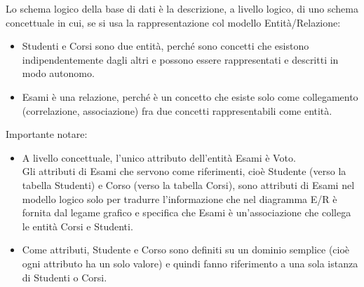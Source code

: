\documentclass[../main.tex]{subfiles}
\begin{document}
	Lo schema logico della base di dati è la descrizione, a livello logico, di uno schema concettuale in cui, se si usa la rappresentazione col modello Entità/Relazione:
	\begin{itemize}
		\item Studenti e Corsi sono due entità, perché sono concetti che esistono indipendentemente dagli altri e possono essere rappresentati e descritti in modo autonomo.
		\item Esami è una relazione, perché è un concetto che esiste solo come collegamento (correlazione, associazione) fra due concetti rappresentabili come entità.
	\end{itemize}
	Importante notare:
	\begin{itemize}
		\item A livello concettuale, l’unico attributo dell’entità Esami è Voto.\\
		Gli attributi di Esami che servono come riferimenti, cioè Studente (verso la tabella Studenti) e Corso (verso la tabella Corsi), sono attributi di Esami nel modello logico solo per tradurre l’informazione che nel diagramma E/R è fornita dal legame grafico e specifica che Esami è un’associazione che collega le entità Corsi e Studenti.
		\item Come attributi, Studente e Corso sono definiti su un dominio semplice (cioè ogni attributo ha un solo valore) e quindi fanno riferimento a una sola istanza di Studenti o Corsi.
	\end{itemize}
\end{document}
